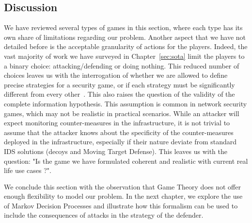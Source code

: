 \subsection{Discussion}
We have reviewed several types of games in this section, where each type has its own share of limitations regarding our problem. Another aspect that we have not detailed before is the acceptable granularity of actions for the players. Indeed, the vast majority of work we have surveyed in Chapter~\ref{sec:sota} limit the players to a binary choice: attacking/defending or doing nothing. This reduced number of choices leaves us with the interrogation of whether we are allowed to define precise strategies for a security game, or if each strategy must be significantly different from every other~\cite{Kiennert2018}. 
This also raises the question of the validity of the complete information hypothesis.
This assumption is common in network security games, which may not be realistic in practical scenarios.
While an attacker will expect monitoring counter-measures in the infrastructure, it is not trivial to assume that the attacker knows about the specificity of the counter-measures deployed in the infrastructure, especially if their nature deviate from standard IDS solutions (\eg decoys and Moving Target Defense).
This leaves us with the question: "Is the game we have formulated coherent and realistic with current real life use cases ?". 

We conclude this section with the observation that Game Theory does not offer enough flexibility to model our problem. In the next chapter, we explore the use of Markov Decision Processes and illustrate how this formalism can be used to include the consequences of attacks in the strategy of the defender.



